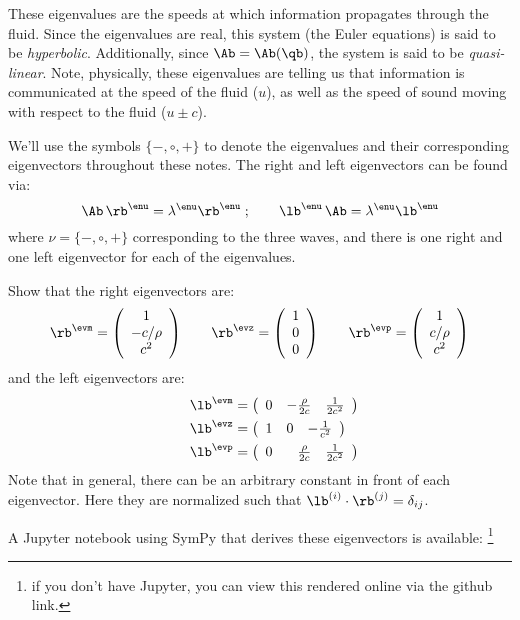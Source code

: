 These eigenvalues are the speeds at which information propagates
through the fluid.  Since the eigenvalues are real, this system (the
Euler equations) is said to be {\em hyperbolic}.  Additionally, since
$\Ab = \Ab(\qb)$, the system is said to be {\em quasi-linear}.  Note,
physically, these eigenvalues are telling us that information is
communicated at the speed of the fluid ($u$), as well as the speed of
sound moving with respect to the fluid ($u \pm c$).

We'll use the symbols $\{-,\circ,+\}$ to denote the eigenvalues and their
corresponding eigenvectors throughout these notes.
%
The right and left eigenvectors can be found via:
\begin{equation}
\Ab \, \rb^\enu = \lambda^\enu \rb^\enu \; ;
\qquad
\lb^\enu \, \Ab  = \lambda^\enu \lb^\enu
\end{equation}
where $\nu = \{-,\circ,+\}$ corresponding to the three waves, and
there is one right and one left eigenvector for each of the eigenvalues.
%
\begin{exercise}
{
Show that the right eigenvectors are:
\begin{equation}
\label{eq:euler:primRevs}
\rb^\evm = \left ( \begin{array}{c} 1 \\ -c/\rho \\ c^2 \end{array} \right )
%
\qquad
\rb^\evz = \left ( \begin{array}{c} 1 \\ 0 \\ 0  \end{array} \right )
%
\qquad
\rb^\evp = \left ( \begin{array}{c} 1 \\ c/\rho \\ c^2 \end{array} \right )
\end{equation}
and the left eigenvectors are:
\begin{align}
\lb^\evm &= \left ( \begin{array}{ccc} 0 & -\frac{\rho}{2c} & \frac{1}{2c^2}
                  \end{array} \right ) \\
%
\qquad
\lb^\evz &= \left ( \begin{array}{ccc} 1 & 0 & -\frac{1}{c^2}  \end{array} \right ) \\
%
\qquad
\lb^\evp &= \left ( \begin{array}{ccc} 0 & \phantom{+}\frac{\rho}{2c} & \frac{1}{2c^2} \end{array} \right )
\end{align}
Note that in general, there can be an arbitrary constant in front of each
eigenvector.  Here they are normalized such that
$\lb^{(i)} \cdot \rb^{(j)} = \delta_{ij}$.
}
\end{exercise}
A {\sf Jupyter} notebook using {\sf SymPy} that derives these
eigenvectors is available:
\footnote{if you don't have {\sf Jupyter}, you can view this rendered online via the github link.}

